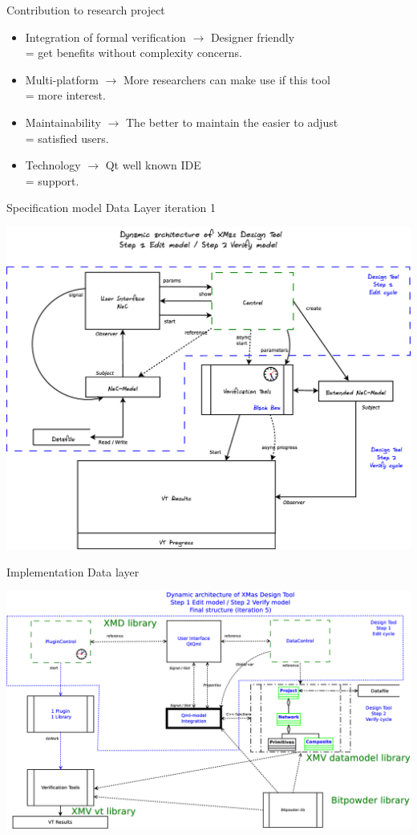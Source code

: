 \documentclass[11pt]{beamer}
\begin{document}
\begin{frame}[t]{Contribution to research project}

	\begin{itemize}
		\item Integration of formal verification   $\rightarrow$  Designer friendly \\
		= get benefits without complexity concerns.
		\item Multi-platform $\rightarrow$ More researchers can make use if this tool \\
		= more interest.
		\item Maintainability   $\rightarrow$ The better to maintain the easier to adjust \\
		= satisfied users.
		\item Technology   $\rightarrow$ Qt well known IDE \\
		= support.		
	\end{itemize}
\end{frame}



\begin{frame}{Specification model Data Layer iteration 1}

	\includegraphics[width=.80\linewidth]{pictures/1c-architecture-dynamic-1}

\end{frame}

\begin{frame}{Implementation Data layer}

	\includegraphics[width=.90\linewidth]{pictures/1c-architecture-dynamic-2}

\end{frame}
\end{document}
